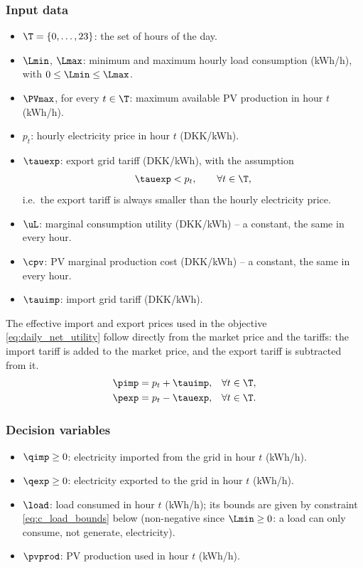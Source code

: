 \subsubsection{Input data}
\begin{itemize}
    \item $\T = \{0, \dots, 23\}$: the set of hours of the day.
    \item $\Lmin$, $\Lmax$: minimum and maximum hourly load consumption (kWh/h), with
    $0 \leq \Lmin \leq \Lmax$.
    \item $\PVmax$, for every $t \in \T$: maximum available PV production in hour $t$
    (kWh/h).
    \item $p_t$: hourly electricity price in hour $t$ (DKK/kWh).
    \item $\tauexp$: export grid tariff (DKK/kWh), with the assumption
    \begin{equation}
        \tauexp < p_t, \qquad \forall t \in \T,
        \label{eq:tariff_assumption}
    \end{equation}
    i.e.\ the export tariff is always smaller than the hourly electricity price.
\end{itemize}
\begin{itemize}
    \item $\uL$: marginal consumption utility (DKK/kWh) -- a constant, the same in every
    hour.
    \item $\cpv$: PV marginal production cost (DKK/kWh) -- a constant, the same in every
    hour.
    \item $\tauimp$: import grid tariff (DKK/kWh).
\end{itemize}
The effective import and export prices used in the objective
\eqref{eq:daily_net_utility} follow directly from the market price and the tariffs: the
import tariff is added to the market price, and the export tariff is subtracted from it.
\begin{align}
    \pimp &= p_t + \tauimp, & \forall t \in \T, \label{eq:effective_import_price} \\
    \pexp &= p_t - \tauexp, & \forall t \in \T. \label{eq:effective_export_price}
\end{align}

\subsubsection{Decision variables}
\begin{itemize}
    \item $\qimp \geq 0$: electricity imported from the grid in hour $t$ (kWh/h).
    \item $\qexp \geq 0$: electricity exported to the grid in hour $t$ (kWh/h).
    \item $\load$: load consumed in hour $t$ (kWh/h); its bounds are given by constraint
    \eqref{eq:c_load_bounds} below (non-negative since $\Lmin \geq 0$: a load can only
    consume, not generate, electricity).
    \item $\pvprod$: PV production used in hour $t$ (kWh/h).
\end{itemize}


